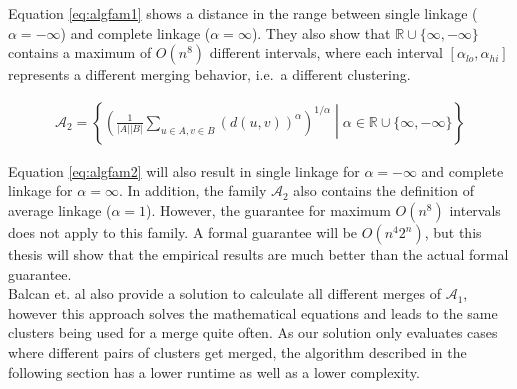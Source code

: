 Equation \ref{eq:algfam1} shows a distance in the range between single linkage ($\alpha = -\infty$) and complete linkage ($\alpha = \infty$). They also show that $\mathbb{R} \cup \{\infty, -\infty\}$ contains a maximum of $O(n^8)$ different intervals, where each interval $[\alpha_{lo}, \alpha_{hi}]$ represents a different merging behavior, i.e.\ a different clustering.

\begin{equation}
    \begin{aligned}
        \mathcal{A}_2 = \left\{ \left( \frac{1}{|A| |B|} \sum\limits_{u \in A, v \in B} (d(u,v))^\alpha \right)^{1 / \alpha} \middle| \alpha \in \mathbb{R} \cup \{\infty, -\infty\} \right\}
    \end{aligned}
    \label{eq:algfam2}
\end{equation}

Equation \ref{eq:algfam2} will also result in single linkage for $\alpha = - \infty$ and complete linkage for $\alpha = \infty$. In addition, the family $\mathcal{A}_2$ also contains the definition of average linkage ($\alpha = 1$). However, the guarantee for maximum $O(n^8)$ intervals does not apply to this family. A formal guarantee will be $O(n^4 2^n)$, but this thesis will show that the empirical results are much better than the actual formal guarantee.\\

Balcan et. al also provide a solution to calculate all different merges of $\mathcal{A}_1$, however this approach solves the mathematical equations and leads to the same clusters being used for a merge quite often. As our solution only evaluates cases where different pairs of clusters get merged, the algorithm described in the following section has a lower runtime as well as a lower complexity.